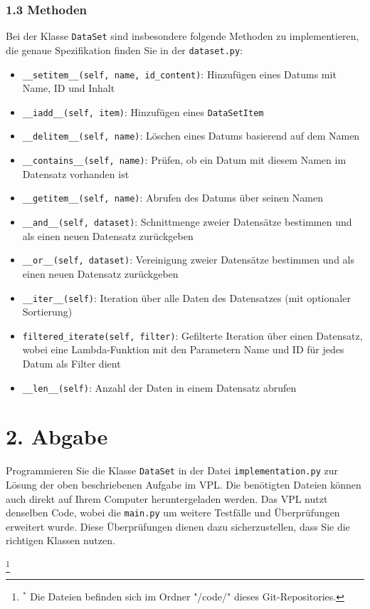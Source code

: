 \documentclass{article}
\begin{document}
\subsubsection*{1.3 Methoden}
Bei der Klasse \texttt{DataSet} sind insbesondere folgende Methoden zu implementieren, die genaue Spezifikation finden Sie in der \texttt{dataset.py}:
\begin{itemize}
    \item \texttt{\_\_setitem\_\_(self, name, id\_content)}: Hinzufügen eines Datums mit Name, ID und Inhalt
    \item \texttt{\_\_iadd\_\_(self, item)}: Hinzufügen eines \texttt{DataSetItem}
    \item \texttt{\_\_delitem\_\_(self, name)}: Löschen eines Datums basierend auf dem Namen
    \item \texttt{\_\_contains\_\_(self, name)}: Prüfen, ob ein Datum mit diesem Namen im Datensatz vorhanden ist
    \item \texttt{\_\_getitem\_\_(self, name)}: Abrufen des Datums über seinen Namen
    \item \texttt{\_\_and\_\_(self, dataset)}: Schnittmenge zweier Datensätze bestimmen und als einen neuen Datensatz zurückgeben
    \item \texttt{\_\_or\_\_(self, dataset)}: Vereinigung zweier Datensätze bestimmen und als einen neuen Datensatz zurückgeben
    \item \texttt{\_\_iter\_\_(self)}: Iteration über alle Daten des Datensatzes (mit optionaler Sortierung)
    \item \texttt{filtered\_iterate(self, filter)}: Gefilterte Iteration über einen Datensatz, wobei eine Lambda-Funktion mit den Parametern Name und ID für jedes Datum als Filter dient
    \item \texttt{\_\_len\_\_(self)}: Anzahl der Daten in einem Datensatz abrufen
\end{itemize}

\section*{2. Abgabe}
Programmieren Sie die Klasse \texttt{DataSet} in der Datei \texttt{implementation.py} zur Lösung der oben beschriebenen Aufgabe im VPL. Die benötigten Dateien können auch direkt auf Ihrem Computer heruntergeladen werden. Das VPL nutzt denselben Code, wobei die \texttt{main.py} um weitere Testfälle und Überprüfungen erweitert wurde. Diese Überprüfungen dienen dazu sicherzustellen, dass Sie die richtigen Klassen nutzen.

\footnote{$^{*}$ Die Dateien befinden sich im Ordner "/code/" dieses Git-Repositories.}
\end{document}
